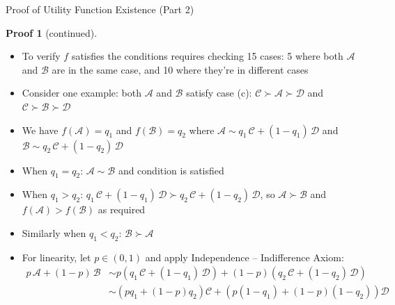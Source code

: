 \documentclass[10pt]{beamer}
\newcommand{\ds}{\displaystyle}
\theoremstyle{definition}
\newtheorem*{prf}{Proof}
\begin{document}
\begin{frame}{Proof of Utility Function Existence (Part 2)}
  \begin{prf}[continued]
    \begin{itemize}[<+->]
      \item To verify $f$ satisfies the conditions requires checking 15 cases: 5 where both $\mathcal{A}$ and $\mathcal{B}$ are in the same case, and 10 where they're in different cases
      \item Consider one example: both $\mathcal{A}$ and $\mathcal{B}$ satisfy case (c): $\mathcal{C} \succ \mathcal{A} \succ \mathcal{D}$ and $\mathcal{C} \succ \mathcal{B} \succ \mathcal{D}$
      \item We have $f(\mathcal{A}) = q_1$ and $f(\mathcal{B}) = q_2$ where $\ds\mathcal{A} \sim q_1\,\mathcal{C} + (1-q_1)\,\mathcal{D}$ and $\ds\mathcal{B} \sim q_2\,\mathcal{C} + (1-q_2)\,\mathcal{D}$
      \item When $q_1 = q_2$: $\mathcal{A} \sim \mathcal{B}$ and condition is satisfied
      \item When $q_1 > q_2$: $\ds q_1\,\mathcal{C} + (1-q_1)\,\mathcal{D} \succ q_2\,\mathcal{C} + (1-q_2)\,\mathcal{D}$, so $\mathcal{A} \succ \mathcal{B}$ and $f(\mathcal{A}) > f(\mathcal{B})$ as required
      \item Similarly when $q_1 < q_2$: $\mathcal{B} \succ \mathcal{A}$ 
      \item For linearity, let $p \in (0, 1)$ and apply Independence -- Indifference Axiom:
        \begin{align*}
          p\,\mathcal{A} + (1-p)\,\mathcal{B} &\sim p(q_1\,\mathcal{C} + (1-q_1)\,\mathcal{D}) + (1-p)(q_2\,\mathcal{C} + (1-q_2)\,\mathcal{D})\\
          &\sim (pq_1 + (1-p)q_2)\mathcal{C} + (p(1-q_1) + (1-p)(1-q_2))\mathcal{D}
        \end{align*}
    \end{itemize}
    \vspace{-5mm}
  \end{prf}
\end{frame}
\end{document}
